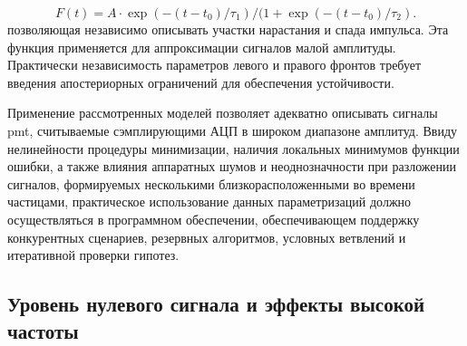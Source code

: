 \begin{itemize}
    \begin{equation}
        F(t) = A \cdot \exp(-(t-t_0)/\tau_1) /(1 + \exp(-(t-t_0)/\tau_2).
    \end{equation}
    позволяющая независимо описывать участки нарастания и спада
    импульса. Эта функция применяется для аппроксимации сигналов
    малой амплитуды. Практически независимость параметров левого и
    правого фронтов требует введения апостериорных ограничений для
    обеспечения устойчивости.
\end{itemize}

Применение рассмотренных моделей позволяет адекватно описывать сигналы
\acrshort{pmt}, считываемые сэмплирующими АЦП в широком диапазоне амплитуд.
Ввиду нелинейности процедуры минимизации, наличия локальных минимумов
функции ошибки, а также влияния аппаратных шумов и неоднозначности при
разложении сигналов, формируемых несколькими близкорасположенными
во времени частицами, практическое использование данных параметризаций
должно осуществляться в программном обеспечении, обеспечивающем
поддержку конкурентных сценариев, резервных алгоритмов, условных
ветвлений и итеративной проверки гипотез.

\subsection{Уровень нулевого сигнала и эффекты высокой частоты}

